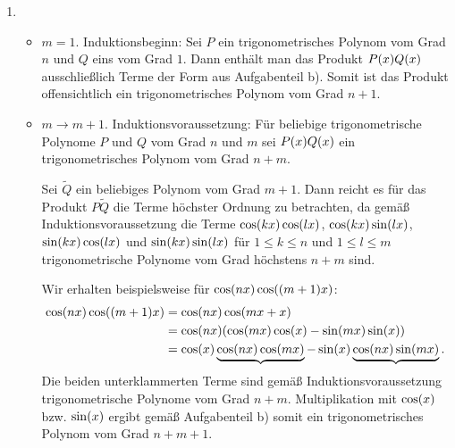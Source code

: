 \documentclass{exercise}
\begin{document}
\begin{enumerate}
        \item
        \begin{itemize}
            \item \(m = 1\).
            Induktionsbeginn: Sei \(P\) ein trigonometrisches Polynom vom Grad \(n\) und \(Q\) eins vom Grad \(1\).
            Dann enthält man das Produkt \(P\parentheses*{x}Q\parentheses*{x}\) ausschließlich Terme der Form aus Aufgabenteil b).
            Somit ist das Produkt offensichtlich ein trigonometrisches Polynom vom Grad \(n + 1\).
            \item \(m \to m + 1\).
            Induktionsvoraussetzung: Für beliebige trigonometrische Polynome \(P\) und \(Q\) vom Grad \(n\) und \(m\) sei \(P\parentheses*{x}Q\parentheses*{x}\) ein trigonometrisches Polynom vom Grad \(n + m\).

            Sei \(\tilde{Q}\) ein beliebiges Polynom vom Grad \(m + 1\).
            Dann reicht es für das Produkt \(P\tilde{Q}\) die Terme höchster Ordnung zu betrachten, da gemäß Induktionsvoraussetzung die Terme \(\cos\parentheses*{kx}\cos\parentheses*{lx}\), \(\cos\parentheses*{kx}\sin\parentheses*{lx}\), \(\sin\parentheses*{kx}\cos\parentheses*{lx}\) und \(\sin\parentheses*{kx}\sin\parentheses*{lx}\) für \(1 \le k \le n\) und \(1 \le l \le m\) trigonometrische Polynome vom Grad höchstens \(n + m\) sind.

            Wir erhalten beispielsweise für \(\cos\parentheses*{nx}\cos\parentheses*{\parentheses*{m + 1}x}\):
            \begin{align*}
                \cos\parentheses*{nx}\cos\parentheses*{\parentheses*{m + 1}x} &= \cos\parentheses*{nx}\cos\parentheses*{mx + x}\\
                &= \cos\parentheses*{nx}\parentheses*{\cos\parentheses*{mx}\cos\parentheses*{x} - \sin\parentheses*{mx}\sin\parentheses*{x}}\\
                &= \cos\parentheses*{x}\underbrace{\cos\parentheses*{nx}\cos\parentheses*{mx}} - \sin\parentheses*{x}\underbrace{\cos\parentheses*{nx}\sin\parentheses*{mx}}.
            \end{align*}
            Die beiden unterklammerten Terme sind gemäß Induktionsvoraussetzung trigonometrische Polynome vom Grad \(n + m\).
            Multiplikation mit \(\cos\parentheses*{x}\) bzw. \(\sin\parentheses*{x}\) ergibt gemäß Aufgabenteil b) somit ein trigonometrisches Polynom vom Grad \(n + m + 1\).
        \end{itemize}
    \end{enumerate}
\end{document}
